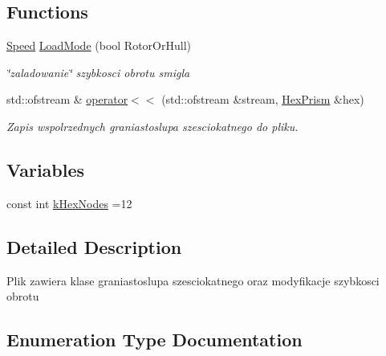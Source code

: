 \subsection*{Functions}
\begin{DoxyCompactItemize}
\item 
\hyperlink{_hex_prism_8hh_ad57b3fa8e45359906ac229567c209a63}{Speed} \hyperlink{_hex_prism_8hh_a112b2d4ee58aaf5e7f794ab4a8223e4c}{Load\+Mode} (bool Rotor\+Or\+Hull)
\begin{DoxyCompactList}\small\item\em \char`\"{}zaladowanie\char`\"{} szybkosci obrotu smigla \end{DoxyCompactList}\item 
std\+::ofstream \& \hyperlink{_hex_prism_8hh_a34d36f827e3974e3b50ad08b1d5dfbdf}{operator$<$$<$} (std\+::ofstream \&stream, \hyperlink{class_hex_prism}{Hex\+Prism} \&hex)
\begin{DoxyCompactList}\small\item\em Zapis wspolrzednych graniastoslupa szesciokatnego do pliku. \end{DoxyCompactList}\end{DoxyCompactItemize}
\subsection*{Variables}
\begin{DoxyCompactItemize}
\item 
const int \hyperlink{_hex_prism_8hh_a80499785678dad84e4b1f1828d7f0835}{k\+Hex\+Nodes} =12
\end{DoxyCompactItemize}


\subsection{Detailed Description}
Plik zawiera klase graniastoslupa szesciokatnego oraz modyfikacje szybkosci obrotu 

\subsection{Enumeration Type Documentation}
